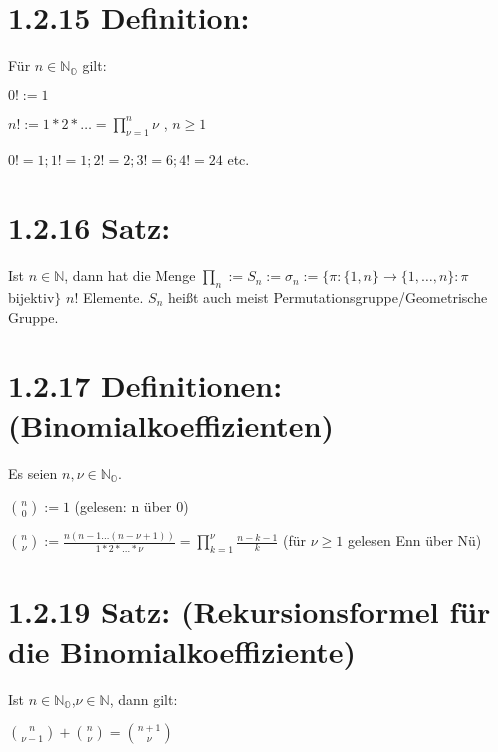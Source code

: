 \documentclass[11pt]{scrartcl}
\begin{document}
\section{1.2.15 Definition:}

Für $n \in \mathbb{N_{O}}$ gilt:
\begin{flushleft}
$0! :=1$
\end{flushleft}
\begin{flushleft}
$n! := 1*2*\dots = \prod \limits_{\nu=1}^{n} \nu $ , $ n \geq 1 $
\end{flushleft}
\begin{flushleft}
$0! =1;1!=1;2!=2;3!=6;4!=24$ etc.
\end{flushleft}

\section{1.2.16 Satz:}
Ist $n \in \mathbb{N}$, dann hat die Menge $\prod_{n} := S_{n} := \sigma_n := \{\pi:\{1,n\} \rightarrow \{1,\dots,n\}:\pi$ bijektiv$\}$ $n!$ Elemente. $ S_{n}$ heißt auch meist Permutationsgruppe/Geometrische Gruppe.

\section{1.2.17 Definitionen: (Binomialkoeffizienten)}
Es seien $n, \nu \in \mathbb{N_{O}}$.

\begin{flushleft}
$ {n \choose 0} := 1 $ (gelesen: n über 0)
\end{flushleft}
\begin{flushleft}
$ {n \choose \nu} := \frac{n(n-1 \dots (n-\nu +1))}{1*2*\dots*\nu} =
\prod \limits_{k=1}^{\nu} \frac{n-k-1}{k} $ (für $\nu \geq 1$ gelesen Enn über Nü)
\end{flushleft}















\section{1.2.19 Satz: (Rekursionsformel für die Binomialkoeffiziente)}

Ist $n \in \mathbb{N_{O}}$,$\nu \in \mathbb{N}$, dann gilt:
\begin{flushleft}
	$ {n \choose \nu -1} +{n \choose \nu} = {n+1 \choose \nu} $ 
\end{flushleft}
\end{document}
